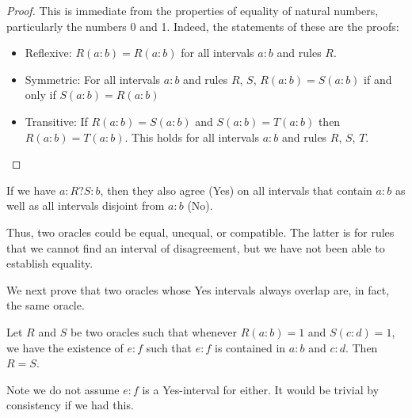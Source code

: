 \documentclass[12pt]{article}
\begin{document}
\begin{proof}
This is immediate from the properties of equality of natural numbers, particularly the numbers 0 and 1. Indeed, the statements of these are the proofs:
\begin{itemize}
    \item Reflexive: $R(a:b)=R(a:b)$ for all intervals $a:b$ and rules $R$.
    \item Symmetric: For all intervals $a:b$ and rules $R$, $S$, $R(a:b)=S(a:b)$ if and only if $S(a:b) = R(a:b)$ 
    \item Transitive: If $R(a:b)=S(a:b)$ and $S(a:b) = T(a:b)$ then $R(a:b)=T(a:b)$. This holds for all intervals $a:b$ and rules $R$, $S$, $T$.
\end{itemize}
\end{proof}

If we have $a:R?S:b$, then they also agree (Yes) on all intervals that contain $a:b$ as well as all intervals disjoint from $a:b$ (No). 

Thus, two oracles could be equal, unequal, or compatible. The latter is for rules that we cannot find an interval of disagreement, but we have not been able to establish equality. 

We next prove that two oracles whose Yes intervals always overlap are, in fact, the same oracle.

\begin{proposition}\label{pr:overlap}
Let $R$ and $S$ be two oracles such that whenever $R(a:b)=1$ and $S(c:d)=1$, we have the existence of $e:f$ such that $e:f$ is contained in $a:b$ and $c:d$.  Then $R =S$.
\end{proposition}

Note we do not assume $e:f$ is a Yes-interval for either. It would be trivial by consistency if we had this. 
\end{document}
